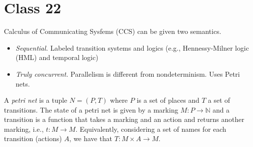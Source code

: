 {{%

\newcommand{\NN}{\mathbb{N}}
\renewcommand{\implies}{\Rightarrow}
\newcommand{\implied}{\Leftarrow}
\newcommand{\eps}{\varepsilon}
\newcommand{\gfp}{\mathrm{gfp}}
\newcommand{\lfp}{\mathrm{lfp}}
\newcommand{\defas}{\coloneqq}
\renewcommand{\le}{\sqsubseteq}
\renewcommand{\ge}{\sqsupseteq}
\renewcommand{\sqcap}{\bigsqcap}
\renewcommand{\sqcup}{\bigsqcup}
\newcommand{\bottom}{\perp}


\newcommand{\Theorem}[2][]{\begin{theorem}[#1]#2\end{theorem}}
\newcommand{\Definition}[2][]{\begin{definition}[#1]#2\end{definition}}
\newcommand{\Example}[2][]{\begin{example}[#1]#2\end{example}}
\newcommand{\Homework}[2][]{\begin{homework}[#1]#2\end{homework}}
\newcommand{\Lemma}[2][]{\begin{lemma}[#1]#2\end{lemma}}
\newcommand{\Remark}[2][]{\begin{remark}[#1]#2\end{remark}}
\newcommand{\Figure}[1]{\begin{figure}#1\end{figure}}
\newcommand{\Itemize}[1]{\begin{itemize}#1\end{itemize}}
\newcommand{\Enumerate}[1]{\begin{enumerate}#1\end{enumerate}}

\usetikzlibrary {petri}

\chapter{Class 22}

Calculus of Communicating Sysfems (CCS) can be given two semantics.
\Itemize {
	\item \emph{Sequential.} 
		Labeled transition systems and logics (e.g., Hennessy-Milner logic (HML) and temporal logic)
	\item \emph{Truly concurrent.} 
		Parallelism is different from nondeterminism.
		Uses Petri nets.
}
	

\Definition[Petri nets]{
	A \emph{petri net} is a tuple $N = (P, T)$ where $P$ is a set of places and $T$ a set of transitions.
	The state of a petri net is given by a marking $M \colon P \to \NN$ and a transition is a function that takes a marking and an action and returns another marking, i.e., $t \colon M \to M$.
	Equivalently, considering a set of names for each transition (actions) $A$, we have that $T \colon M \times A \to M$.
}

}}
